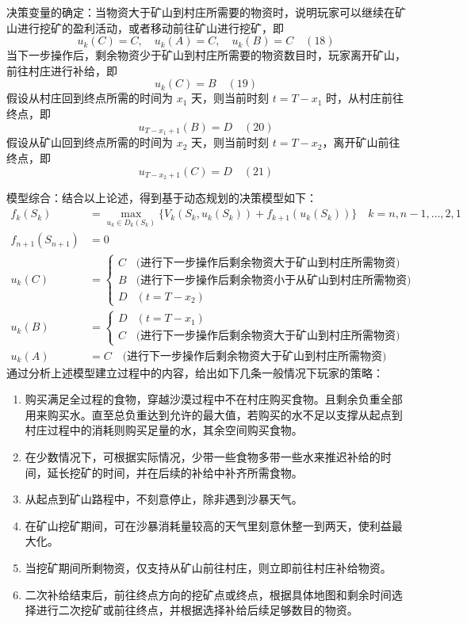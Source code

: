 \documentclass[UTF8]{article}
\begin{document}
决策变量的确定：当物资大于矿山到村庄所需要的物资时，说明玩家可以继续在矿山进行挖矿的盈利活动，或者移动前往矿山进行挖矿，即
\[
u_k(C) = C, \quad u_k(A) = C, \quad u_k(B) = C \quad (18)
\]
当下一步操作后，剩余物资少于矿山到村庄所需要的物资数目时，玩家离开矿山，前往村庄进行补给，即
\[
u_k(C) = B \quad (19)
\]
假设从村庄回到终点所需的时间为 \(x_1\) 天，则当前时刻 \(t = T - x_1\) 时，从村庄前往终点，即
\[
u_{T-x_1+1}(B) = D \quad (20)
\]
假设从矿山回到终点所需的时间为 \(x_2\) 天，则当前时刻 \(t = T - x_2\)，离开矿山前往终点，即
\[
u_{T-x_2+1}(C) = D \quad (21)
\]

模型综合：结合以上论述，得到基于动态规划的决策模型如下：
\[
\begin{aligned}
f_k(S_k) &= \max_{u_k\in D_k(S_k)}\{V_k(S_k,u_k(S_k)) + f_{k+1}(u_k(S_k))\} \quad k = n,n-1,\dots,2,1 \\
f_{n+1}(S_{n+1}) &= 0 \\
u_k(C) &= \begin{cases}
C & \text{(进行下一步操作后剩余物资大于矿山到村庄所需物资)} \\
B & \text{(进行下一步操作后剩余物资小于从矿山到村庄所需物资)} \\
D & (t = T - x_2)
\end{cases} \\
u_k(B) &= \begin{cases}
D & (t = T - x_1) \\
C & \text{(进行下一步操作后剩余物资大于矿山到村庄所需物资)}
\end{cases} \\
u_k(A) &= C \quad \text{(进行下一步操作后剩余物资大于矿山到村庄所需物资)}
\end{aligned}
\]
通过分析上述模型建立过程中的内容，给出如下几条一般情况下玩家的策略：
\begin{enumerate}
    \item 购买满足全过程的食物，穿越沙漠过程中不在村庄购买食物。且剩余负重全部用来购买水。直至总负重达到允许的最大值，若购买的水不足以支撑从起点到村庄过程中的消耗则购买足量的水，其余空间购买食物。
    \item 在少数情况下，可根据实际情况，少带一些食物多带一些水来推迟补给的时间，延长挖矿的时间，并在后续的补给中补齐所需食物。
    \item 从起点到矿山路程中，不刻意停止，除非遇到沙暴天气。
    \item 在矿山挖矿期间，可在沙暴消耗量较高的天气里刻意休整一到两天，使利益最大化。
    \item 当挖矿期间所剩物资，仅支持从矿山前往村庄，则立即前往村庄补给物资。
    \item 二次补给结束后，前往终点方向的挖矿点或终点，根据具体地图和剩余时间选择进行二次挖矿或前往终点，并根据选择补给后续足够数目的物资。
\end{enumerate}
\end{document}
